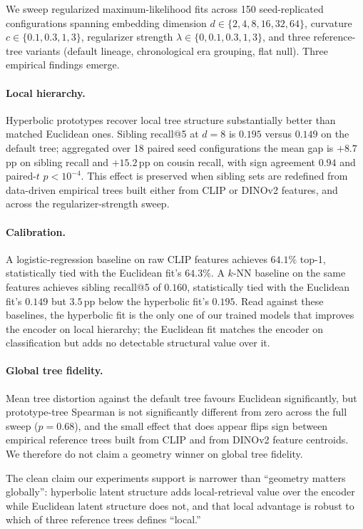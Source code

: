 We sweep regularized maximum-likelihood fits across 150
seed-replicated configurations spanning embedding dimension
$d \in \{2, 4, 8, 16, 32, 64\}$, curvature $c \in \{0.1, 0.3, 1, 3\}$,
regularizer strength $\lambda \in \{0, 0.1, 0.3, 1, 3\}$, and three
reference-tree variants (default lineage, chronological era grouping,
flat null). Three empirical findings emerge.

\paragraph{Local hierarchy.} Hyperbolic prototypes recover local tree
structure substantially better than matched Euclidean ones. Sibling
recall@5 at $d{=}8$ is $0.195$ versus $0.149$ on the default tree;
aggregated over 18 paired seed configurations the mean gap is
$+8.7$\,pp on sibling recall and $+15.2$\,pp on cousin recall, with
sign agreement $0.94$ and paired-$t$ $p<10^{-4}$. This effect is
preserved when sibling sets are redefined from data-driven empirical
trees built either from CLIP or DINOv2 \citep{oquab2024dinov2}
features, and across the regularizer-strength sweep.

\paragraph{Calibration.} A logistic-regression baseline on raw CLIP
features achieves $64.1\%$ top-1, statistically tied with the
Euclidean fit's $64.3\%$. A $k$-NN baseline on the same features
achieves sibling recall@5 of $0.160$, statistically tied with the
Euclidean fit's $0.149$ but $3.5$\,pp below the hyperbolic fit's
$0.195$. Read against these baselines, the hyperbolic fit is the only
one of our trained models that improves the encoder on local
hierarchy; the Euclidean fit matches the encoder on classification
but adds no detectable structural value over it.

\paragraph{Global tree fidelity.} Mean tree distortion against the
default tree favours Euclidean significantly, but
prototype-tree Spearman is not significantly different from zero
across the full sweep ($p=0.68$), and the small effect that does
appear flips sign between empirical reference trees built from CLIP
and from DINOv2 feature centroids. We therefore do not claim a
geometry winner on global tree fidelity.

The clean claim our experiments support is narrower than ``geometry
matters globally'': hyperbolic latent structure adds local-retrieval
value over the encoder while Euclidean latent structure does not, and
that local advantage is robust to which of three reference trees
defines ``local.''

